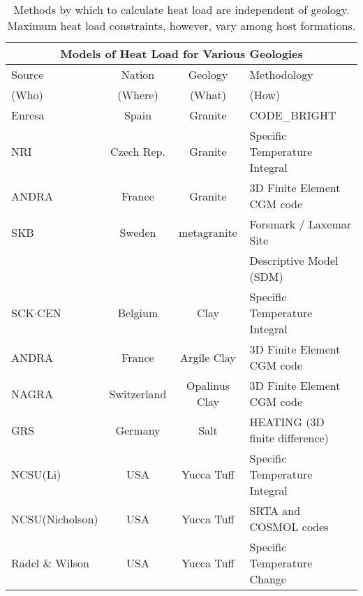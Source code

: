  \begin{table}[h!]
    \centering
    \footnotesize{
    \begin{tabular}{|l|c|c|l|}
      \multicolumn{4}{c}{\textbf{Models of Heat Load for Various Geologies}}\\
      \hline
      Source & Nation & Geology & Methodology \\  
      (Who) & (Where) & (What) & (How) \\  
      \hline
      Enresa \cite{von_lensa_red-impact_2008}           & Spain       & Granite       &  CODE\_BRIGHT  \\ 
      NRI   \cite{von_lensa_red-impact_2008}            & Czech Rep.  & Granite       &  Specific Temperature Integral   \\
      ANDRA \cite{andra_granite:_2005}                  & France      & Granite       &  3D Finite Element CGM code   \\
      SKB \cite{ab_long-term_2006}                      & Sweden      & metagranite   &  Forsmark / Laxemar Site \\
                                                        &             &               &  Descriptive Model (SDM)\\
      SCK$\cdot$CEN   \cite{von_lensa_red-impact_2008}  & Belgium     & Clay          &  Specific Temperature Integral   \\ 
      ANDRA \cite{andra_argile:_2005}                   & France      & Argile Clay   &  3D Finite Element CGM code   \\
      NAGRA \cite{johnson_project_2002, johnson_calculations_2002}  & Switzerland  & Opalinus Clay &  3D Finite Element CGM code \\
      GRS \cite{von_lensa_red-impact_2008}              & Germany     & Salt          &  HEATING (3D finite difference)   \\ 
      NCSU(Li)   \cite{li_examining_2007}               & USA         & Yucca Tuff    &  Specific Temperature Integral \\        
      NCSU(Nicholson) \cite{nicholson_thermal_2007}     & USA         & Yucca Tuff    &  SRTA and COSMOL codes\\
      Radel \& Wilson \cite{radel_repository_2007}      & USA         & Yucca Tuff    &  Specific Temperature Change \\ 
      \hline
    \end{tabular}
    \caption[Models for Heat Transport for Various Geologies]{Methods by which to calculate heat 
    load are independent of geology. Maximum heat load constraints, however, vary among host formations. }
    \label{tab:heat}
    }
  \end{table}
